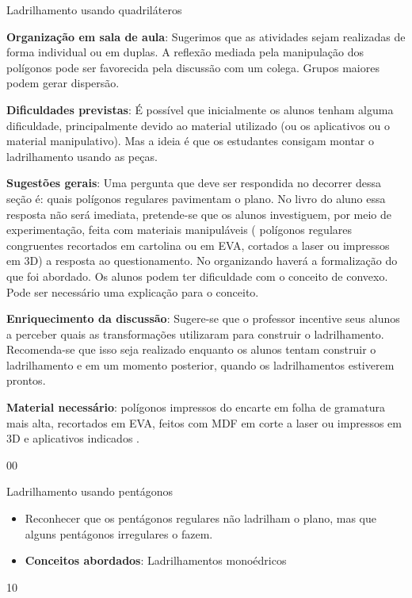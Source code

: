 \begin{sugestions}{Ladrilhamento usando quadriláteros}
{
\textbf{Organização em sala de aula}: Sugerimos que as atividades sejam realizadas de forma individual ou em duplas. A reflexão mediada pela manipulação dos polígonos pode ser favorecida pela discussão com um colega. Grupos maiores podem gerar dispersão.

\textbf{Dificuldades previstas}: É possível que inicialmente os alunos tenham alguma dificuldade, principalmente devido ao material utilizado (ou os aplicativos ou o material manipulativo). Mas a ideia é que os estudantes consigam montar o ladrilhamento usando as peças. 

\textbf{Sugestões gerais}: Uma pergunta que deve ser respondida no decorrer dessa seção é: quais polígonos regulares pavimentam o plano. No livro do aluno essa resposta não será imediata, pretende-se que os alunos investiguem, por meio de experimentação, feita com materiais manipuláveis ( polígonos regulares congruentes recortados em cartolina ou em EVA, cortados a laser ou impressos em 3D) a resposta ao questionamento. No organizando haverá a formalização do que foi abordado.  Os alunos podem ter dificuldade com o conceito de convexo. Pode ser necessário uma explicação para o conceito. 

\textbf{Enriquecimento da discussão}: Sugere-se que o professor incentive seus alunos a perceber quais as transformações utilizaram para construir o ladrilhamento. Recomenda-se que isso seja realizado enquanto os alunos tentam construir o ladrilhamento e em um momento posterior, quando os ladrilhamentos estiverem prontos.

\textbf{Material necessário}: polígonos impressos do encarte em folha de gramatura mais alta, recortados em EVA, feitos com MDF em corte a laser ou impressos em 3D e aplicativos indicados .
}{0}{0}
\end{sugestions}
\begin{objectives}{Ladrilhamento usando pentágonos}
{
\begin{itemize}
\item Reconhecer que os pentágonos regulares não ladrilham o plano, mas que alguns pentágonos irregulares o fazem.
\item \textbf{Conceitos abordados}: Ladrilhamentos monoédricos
\end{itemize}
}{1}{0}
\end{objectives}

